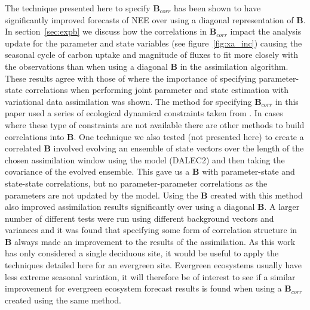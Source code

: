 \documentclass[review]{elsarticle}
\begin{document}
The technique presented here to specify ${\mathbf{B}}_{corr}$ has been shown to have significantly improved forecasts of NEE over using a diagonal representation of ${\mathbf{B}}$. In section~\ref{sec:expb} we discuss how the correlations in ${\mathbf{B}}_{corr}$ impact the analysis update for the parameter and state variables (see figure~\ref{fig:xa_inc}) causing the seasonal cycle of carbon uptake and magnitude of fluxes to fit more closely with the observations than when using a diagonal ${\mathbf{B}}$ in the assimilation algorithm. These results agree with those of \citet{smith2009variational} where the importance of specifying parameter-state correlations when performing joint parameter and state estimation with variational data assimilation was shown. The method for specifying ${\mathbf{B}}_{corr}$ in this paper used a series of ecological dynamical constraints taken from \citet{Bloom2015}. In cases where these type of constraints are not available there are other methods to build correlations into $\textbf{B}$. One technique we also tested (not presented here) to create a correlated $\textbf{B}$ involved evolving an ensemble of state vectors over the length of the chosen assimilation window using the model (DALEC2) and then taking the covariance of the evolved ensemble. This gave us a \textbf{B} with parameter-state and state-state correlations, but no parameter-parameter correlations as the parameters are not updated by the model. Using the $\textbf{B}$ created with this method also improved assimilation results significantly over using a diagonal $\textbf{B}$. A larger number of different tests were run using different background vectors and variances and it was found that specifying some form of correlation structure in $\textbf{B}$ always made an improvement to the results of the assimilation. As this work has only considered a single deciduous site, it would be useful to apply the techniques detailed here for an evergreen site. Evergreen ecosystems usually have less extreme seasonal variation, it will therefore be of interest to see if a similar improvement for evergreen ecosystem forecast results is found when using a ${\mathbf{B}}_{corr}$ created using the same method.
\end{document}
